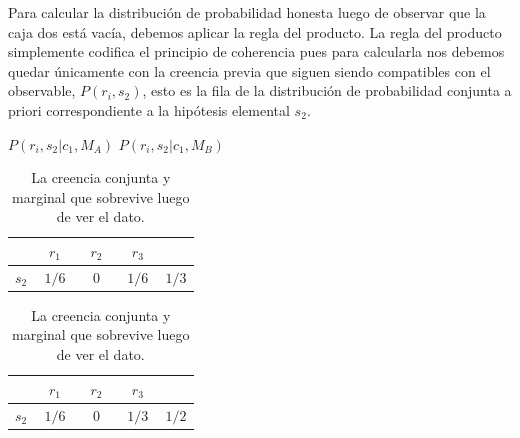 \documentclass[a4paper,11pt]{book}
\theoremstyle{definition}
\begin{document}

Para calcular la distribución de probabilidad honesta luego de observar que la caja dos está vac\'ia, debemos aplicar la regla del producto.
%
La regla del producto simplemente codifica el principio de coherencia pues para calcularla nos debemos quedar únicamente con la creencia previa que siguen siendo compatibles con el observable, $P(r_i, s_2)$, esto es la fila de la distribución de probabilidad conjunta a priori correspondiente a la hipótesis elemental $s_2$.
%
\begin{table}[ht!]
\centering
$P(r_i, s_2 |c_1, M_A)$ \hspace{4.3cm} $P(r_i, s_2 | c_1, M_B)$ \\[0.1cm]
\begin{tabular}{|c|c|c|c||c|} \hline \setlength\tabcolsep{0.2cm}
       & \, $r_1$ \, &  \, $r_2$ \, & \, $r_3$ \, & \\ \hline
  $s_2$ & $1/6$ & $0$ & $1/6$ & $1/3$ \\ \hline
  \end{tabular}
  \hspace{1.5cm}
  \begin{tabular}{|c|c|c|c||c|} \hline  \setlength\tabcolsep{0.2cm}
 & \, $r_1$ \, &  \, $r_2$ \, & \, $r_3$ \, & \\ \hline
  $s_2$ & $1/6$ & $0$ & $1/3$ & $1/2$ \\ \hline
  \end{tabular}
  \caption{La creencia conjunta y marginal que sobrevive luego de ver el dato.}
  \label{tab:creencia_compatible}
\end{table}

\end{document}
